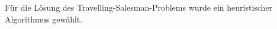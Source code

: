 \documentclass[ngerman,10pt]{article}
\begin{document}
	Für die Lösung des Travelling-Salesman-Problems wurde ein heuristischer Algorithmus \cite{lin1973} gewählt.
	
	\printbibliography
\end{document}
